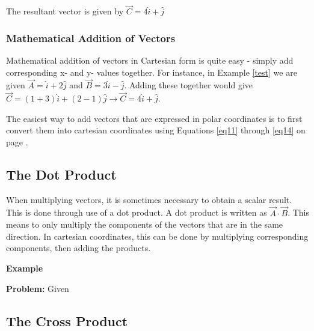 \begin{mdframed}[backgroundcolor=blue!10!white]
\begin{center}
		
		
		
		
			
			
			
		\end{center}
		
		The resultant vector is given by $\vec{C} = 4 \hat{i} + \hat{j}$
		
	\end{mdframed}
	
	\subsubsection{Mathematical Addition of Vectors}
	Mathematical addition of vectors in Cartesian form is quite easy - simply add corresponding x- and y- values together.  For instance, in Example \ref{test} we are given  $\vec{A} =  \hat{i} + 2 \hat{j} $ and $\vec{B} = 3 \hat{i} - \hat{j} $.  Adding these together would give $\vec{C} = (1 +3) \hat{i} + (2-1)\hat{j} \longrightarrow \vec{C} =  4 \hat{i} + \hat{j} $.
	
	The easiest way to add vectors that are expressed in polar coordinates is to first convert them into cartesian coordinates using Equations \eqref{eq11} through \eqref{eq14} on page \pageref{eq11}.
	
	
	
	\subsection{The Dot Product}  
	When multiplying vectors, it is sometimes necessary to obtain a scalar result.  This is done through use of a dot product.  A dot product is written as $\vec{A} \cdot \vec{B} $.  This means to only multiply the components of the vectors that are in the same direction.  In cartesian coordinates, this can be done by multiplying corresponding components, then adding the products.  
	
		\begin{mdframed}[backgroundcolor=blue!10!white]
			\begin{center}
				\textbf{Example \thesubsection}	\label{example:dotproduct}
				
				
			\end{center}
		
		\textbf{Problem:} Given 
		\end{mdframed}
	
	
	
	
	
	\subsection{The Cross Product}   
	
